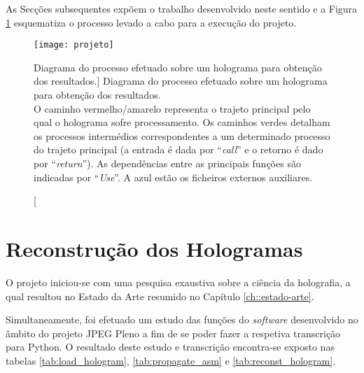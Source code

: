 As Secções subsequentes expõem o trabalho desenvolvido neste sentido e a Figura \ref{fig:projeto} esquematiza o processo levado a cabo para a execução do projeto.

\begin{figure}[!htbp]
    \centering
    \texttt{[image: projeto]}
    \caption
        [Diagrama do processo efetuado sobre um holograma para obtenção dos resultados.]
        {
            Diagrama do processo efetuado sobre um holograma para obtenção dos resultados.\\
            O caminho vermelho/amarelo representa o trajeto principal pelo qual o holograma sofre processamento. Os caminhos verdes detalham os processos intermédios correspondentes a um determinado processo do trajeto principal (a entrada é dada por ``\textit{call}'' e o retorno é dado por ``\textit{return}''). As dependências entre as principais funções são indicadas por ``\textit{Use}''. A azul estão os ficheiros externos auxiliares. \\
        }
    \label{fig:projeto}
\end{figure}


\section{Reconstrução dos Hologramas}
\label{sec::imp-test:reconst-hologram}

O projeto iniciou-se com uma pesquisa exaustiva sobre a ciência da holografia, a qual resultou no Estado da Arte resumido no Capítulo \ref{ch::estado-arte}.

Simultaneamente, foi efetuado um estudo das funções do \textit{software} desenvolvido no âmbito do projeto JPEG Pleno a fim de se poder fazer a respetiva transcrição para Python. O resultado deste estudo e transcrição encontra-se exposto nas tabelas \ref{tab:load_hologram}, \ref{tab:propagate_asm} e \ref{tab:reconst_hologram}.

